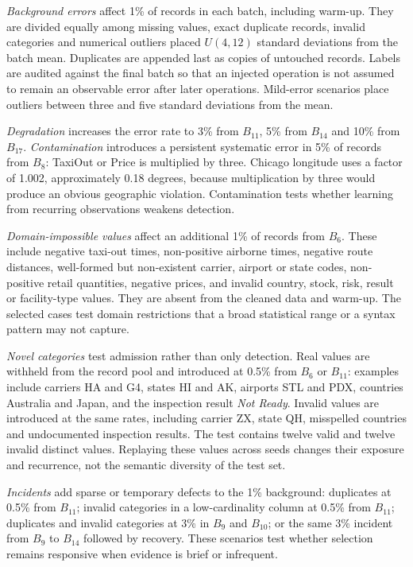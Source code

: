 \emph{Background errors} affect 1\% of records in each batch, including warm-up. They are divided equally among missing values, exact duplicate records, invalid categories and numerical outliers placed $U(4,12)$ standard deviations from the batch mean. Duplicates are appended last as copies of untouched records. Labels are audited against the final batch so that an injected operation is not assumed to remain an observable error after later operations. Mild-error scenarios place outliers between three and five standard deviations from the mean.

\emph{Degradation} increases the error rate to 3\% from $B_{11}$, 5\% from $B_{14}$ and 10\% from $B_{17}$. \emph{Contamination} introduces a persistent systematic error in 5\% of records from $B_8$: TaxiOut or Price is multiplied by three. Chicago longitude uses a factor of 1.002, approximately 0.18 degrees, because multiplication by three would produce an obvious geographic violation. Contamination tests whether learning from recurring observations weakens detection.

\emph{Domain-impossible values} affect an additional 1\% of records from $B_6$. These include negative taxi-out times, non-positive airborne times, negative route distances, well-formed but non-existent carrier, airport or state codes, non-positive retail quantities, negative prices, and invalid country, stock, risk, result or facility-type values. They are absent from the cleaned data and warm-up. The selected cases test domain restrictions that a broad statistical range or a syntax pattern may not capture.

\emph{Novel categories} test admission rather than only detection. Real values are withheld from the record pool and introduced at 0.5\% from $B_6$ or $B_{11}$: examples include carriers HA and G4, states HI and AK, airports STL and PDX, countries Australia and Japan, and the inspection result \emph{Not Ready}. Invalid values are introduced at the same rates, including carrier ZX, state QH, misspelled countries and undocumented inspection results. The test contains twelve valid and twelve invalid distinct values. Replaying these values across seeds changes their exposure and recurrence, not the semantic diversity of the test set.

\emph{Incidents} add sparse or temporary defects to the 1\% background: duplicates at 0.5\% from $B_{11}$; invalid categories in a low-cardinality column at 0.5\% from $B_{11}$; duplicates and invalid categories at 3\% in $B_9$ and $B_{10}$; or the same 3\% incident from $B_9$ to $B_{14}$ followed by recovery. These scenarios test whether selection remains responsive when evidence is brief or infrequent.

